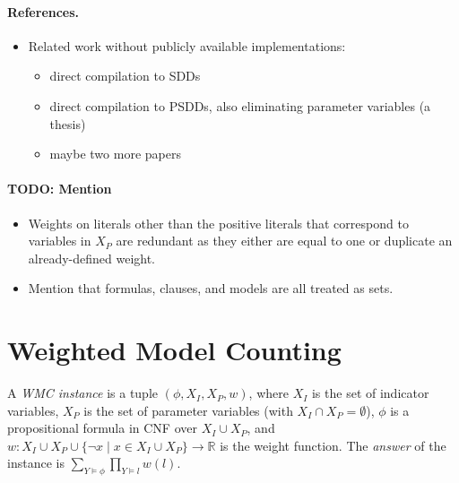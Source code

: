 \documentclass[runningheads]{llncs}
\begin{document}
\paragraph{References.}
\begin{itemize}
\item Related work without publicly available implementations:
  \begin{itemize}
  \item direct compilation to SDDs \cite{DBLP:conf/ecsqaru/ChoiKD13}
  \item direct compilation to PSDDs, also eliminating parameter variables (a thesis)
  \item maybe two more papers
  \end{itemize}
\end{itemize}

\paragraph{TODO: Mention}
\begin{itemize}
\item Weights on literals other than the positive literals that correspond to
  variables in $X_P$ are redundant as they either are equal to one or duplicate
  an already-defined weight.
\item Mention that formulas, clauses, and models are all treated as sets.
\end{itemize}

\section{Weighted Model Counting}

\begin{definition}
  A \emph{WMC instance} is a tuple $(\phi, X_I, X_P, w)$, where $X_I$ is
  the set of indicator variables, $X_P$ is the set of parameter variables (with
  $X_I \cap X_P = \emptyset$), $\phi$ is a propositional formula in CNF over
  $X_I \cup X_P$, and $w\colon X_I \cup X_P \cup \{\neg x \mid x \in X_I \cup
  X_P\} \to \mathbb{R}$ is the weight function. The \emph{answer} of the
  instance is $\sum_{Y \models \phi} \prod_{Y \models l} w(l)$.
\end{definition}
\end{document}
